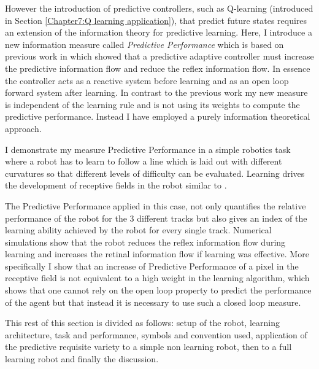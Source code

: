 However the introduction of predictive controllers, such as Q-learning
\citep{TD} (introduced in Section \ref{Chapter7:Q learning application}), 
that predict future states requires an extension of the
information theory for predictive learning. Here, I introduce
a new information measure called 
\textsl{Predictive Performance} which is based on previous work in
\citet{Porr2005kyb} which showed
that a predictive adaptive controller must increase the predictive
information flow and reduce the reflex information flow.  In essence
the controller acts as a reactive system before learning and as an
open loop forward system after learning. In contrast to the
previous work my new measure is independent of the learning
rule and is not using its weights to compute the predictive
performance. Instead I have employed a purely information theoretical
approach.

I demonstrate my measure Predictive Performance in a simple
robotics task where a robot has to learn to follow a line which is laid
out with different curvatures so that different levels of difficulty
can be evaluated. Learning drives the development of receptive
fields in the robot similar to \citet{Kulvicius2007:RFrobot}. 
 
The Predictive Performance applied in this case, not only quantifies
the relative performance of the robot for the 3 different tracks but
also gives an index of the learning ability achieved by the robot
for every single track. Numerical simulations show that the robot
reduces the reflex information flow during learning and increases the
retinal information flow if learning was effective. More
specifically I show that an increase of Predictive Performance of
a pixel in the receptive field is not equivalent to a high weight
in the learning algorithm, which shows that one cannot rely on the
open loop property to predict the performance of the agent but
that instead it is necessary to use such a closed loop measure.

This rest of this section is divided as follows: setup of the robot,
learning architecture, task and performance, symbols and convention
used, application of the predictive requisite variety to a simple non
learning robot, then to a full learning robot and finally the discussion.


